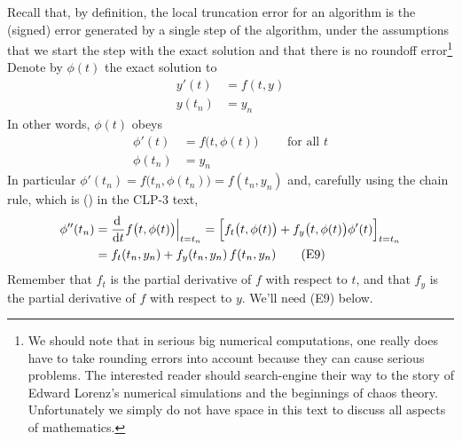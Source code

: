 Recall that, by definition, the local truncation error for an algorithm
is the (signed) error generated by a single step of the algorithm, under the 
assumptions that we start the step with the exact solution and that there
is no roundoff error\footnote{We should note that in serious big
numerical computations, one really does have to take rounding errors into account because they can cause serious problems. The interested reader should search-engine their way to the story of Edward Lorenz's numerical simulations and the beginnings of chaos theory. Unfortunately we simply do not have space in this text to discuss all aspects of mathematics.}
Denote by $\phi(t)$ the exact solution to 
\begin{align*}
y'(t)&=f(t,y) \\
y(t_n)&=y_n
\end{align*}
In other words, $\phi(t)$ obeys 
\begin{align*}
\phi'(t) &= f\big(t,\phi(t)\big)\qquad\text{ for all }t \\
\phi(t_n)&=y_n
\end{align*}
In particular $\phi'(t_n)=f\big(t_n,\phi(t_n)\big)=f(t_n,y_n)$ and,
carefully using the chain rule, which is () in the CLP-3 text, 
\begin{align*}
\phi''(t_n)&=\diff{}{t}f\big(t,\phi(t)\big)\Big|_{t=t_n}
 =\Big[f_t\big(t,\phi(t)\big)+f_y\big(t,\phi(t)\big)\phi'(t)\Big]_{t=t_n} \\
&=f_t(t_n,y_n)+f_y(t_n,y_n)\,f(t_n,y_n)
\tag{E9}\end{align*}
Remember that $f_t$ is the partial derivative of $f$ with respect to $t$, 
and that $f_y$ is the partial derivative of $f$ with respect to $y$. We'll need (E9) below.

